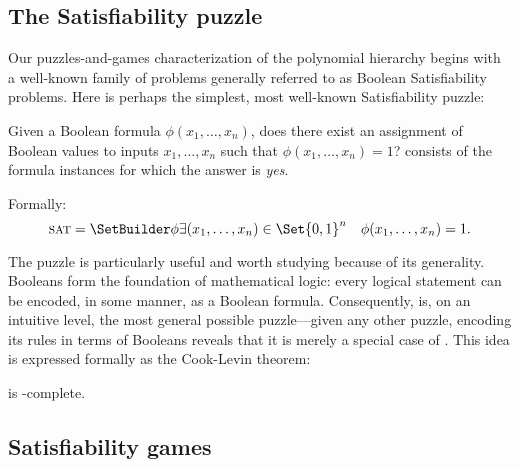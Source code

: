 \subsection{The Satisfiability puzzle}


Our puzzles-and-games characterization of the polynomial hierarchy begins with
a well-known family of problems generally referred to as Boolean Satisfiability
problems.  Here is perhaps the simplest, most well-known Satisfiability puzzle:

\begin{definition}%
  Given a Boolean formula \(\phi(x_1, \dots, x_n)\), does there exist an
  assignment of Boolean values to inputs \(x_1, \dots, x_n\) such that
  \(\phi(x_1, \dots, x_n) = 1\)?   consists of the formula
  instances for which the answer is \emph{yes}.

  Formally:
  \[
    \Problem{sat} = \SetBuilder \phi {
      \exists (x_1, \dots, x_n) \in \Set{0,1}^n \quad \phi(x_1, \dots, x_n) = 1
    }.
  \]
\end{definition}

The \SAT{} puzzle is particularly useful and worth studying because of its
generality.  Booleans form the foundation of mathematical logic: every logical
statement can be encoded, in some manner, as a Boolean formula.  Consequently,
\SAT{} is, on an intuitive level, the most general possible puzzle---given any
other puzzle, encoding its rules in terms of Booleans reveals that it is merely
a special case of \SAT.  This idea is expressed formally as the Cook-Levin
theorem:

\begin{theorem}
  \SAT{} is \NP-complete.
\end{theorem}


\subsection{Satisfiability games}

